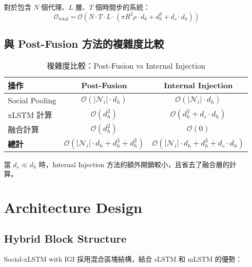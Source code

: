 \documentclass[11pt,a4paper]{article}
\begin{document}
對於包含 $N$ 個代理、$L$ 層、$T$ 個時間步的系統：
\begin{equation}
\mathcal{O}_{\text{total}} = \mathcal{O}(N \cdot T \cdot L \cdot (\pi R^2 \rho \cdot d_h + d_h^3 + d_s \cdot d_h))
\end{equation}

\subsection{與 Post-Fusion 方法的複雜度比較}

\begin{table}[h]
\centering
\begin{tabular}{|l|c|c|}
\hline
\textbf{操作} & \textbf{Post-Fusion} & \textbf{Internal Injection} \\
\hline
Social Pooling & $\mathcal{O}(|\mathcal{N}_i| \cdot d_h)$ & $\mathcal{O}(|\mathcal{N}_i| \cdot d_h)$ \\
xLSTM 計算 & $\mathcal{O}(d_h^3)$ & $\mathcal{O}(d_h^3 + d_s \cdot d_h)$ \\
融合計算 & $\mathcal{O}(d_h^2)$ & $\mathcal{O}(0)$ \\
\hline
\textbf{總計} & $\mathcal{O}(|\mathcal{N}_i| \cdot d_h + d_h^3 + d_h^2)$ & $\mathcal{O}(|\mathcal{N}_i| \cdot d_h + d_h^3 + d_s \cdot d_h)$ \\
\hline
\end{tabular}
\caption{複雜度比較：Post-Fusion vs Internal Injection}
\end{table}

當 $d_s \ll d_h$ 時，Internal Injection 方法的額外開銷較小，且省去了融合層的計算。

\section{Architecture Design}

\subsection{Hybrid Block Structure}

Social-xLSTM with IGI 採用混合區塊結構，結合 sLSTM 和 mLSTM 的優勢：
\end{document}
